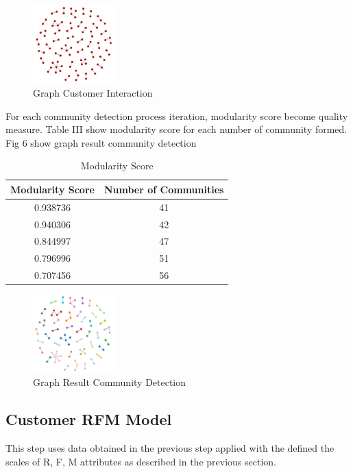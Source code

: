\documentclass[conference]{IEEEtran}
\begin{document}
\begin{figure}[h]
\centering
\includegraphics[width=\columnwidth, height=3cm,keepaspectratio]{figure/graph_awal}
\caption{Graph Customer Interaction}
\label{graph_customer}
\end{figure}

For each community detection process iteration, modularity score become quality measure. Table III show modularity score for each number of community formed. Fig 6 show graph result community detection

\begin{table}[h]
\renewcommand{\arraystretch}{1.3}
\caption{Modularity Score}
\label{tab:modularity_score}
\centering
\begin{tabular}{c|c}
    \hline
    Modularity Score  &  Number of Communities\\
    \hline
    0.938736 & 41\\
    \hline
    0.940306 & 42\\
    \hline
    0.844997 & 47\\
    \hline
    0.796996 & 51\\
    \hline
    0.707456 & 56\\
    \hline
\end{tabular}
\end{table}

\begin{figure}[h]
\centering
\includegraphics[width=\columnwidth, height=3cm,keepaspectratio]{figure/graph_deteksi}
\caption{Graph Result Community Detection}
\label{graph_community_detection}
\end{figure}

\subsection{Customer RFM Model}
This step uses data obtained in the previous step applied with the defined the scales of R, F, M attributes as described in the previous section.
\end{document}

